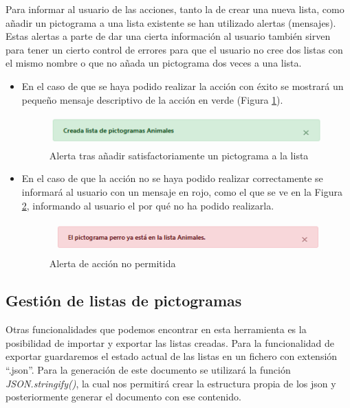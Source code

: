 Para informar al usuario de las acciones, tanto la de crear una nueva lista, como añadir un pictograma a una lista existente se han utilizado alertas (mensajes). Estas alertas a parte de dar una cierta información al usuario también sirven para tener un cierto control de errores para que el usuario no cree dos listas con el mismo nombre o que no añada un pictograma dos veces a una lista.


\begin{itemize}
	\item En el caso de que se haya podido realizar la acción con éxito se mostrará un pequeño mensaje descriptivo de la acción en verde (Figura \ref{fig:alertlistapicto}).
	
	\begin{figure}[h!]
		\centering
		\includegraphics[width=0.7\linewidth]{Imagenes/Bitmap/alertListaPicto}
		\caption{ Alerta tras añadir satisfactoriamente un pictograma a la lista}
		\label{fig:alertlistapicto}
	\end{figure}
	
	
	\item  En el caso de que la acción no se haya podido realizar correctamente se informará al usuario con un mensaje en rojo, como el que se ve en la Figura \ref{fig:alerterrorlistapicto}, informando al usuario el por qué no ha podido realizarla.
	
	\begin{figure}[h!]
		\centering
		\includegraphics[width=0.7\linewidth]{Imagenes/Bitmap/alertErrorListaPicto}
		\caption{Alerta de acción no permitida}
		\label{fig:alerterrorlistapicto}
	\end{figure}
	
	
	
\end{itemize}

\subsection{Gestión de listas de pictogramas}

Otras funcionalidades que podemos encontrar en esta herramienta es la posibilidad de importar y exportar las listas creadas.
Para la funcionalidad de exportar guardaremos el estado actual de las listas en un fichero con extensión “.json”. Para la generación de este documento se utilizará la función \textit{JSON.stringify()}, la cual nos permitirá crear la estructura propia de los json y posteriormente generar el documento con ese contenido.

